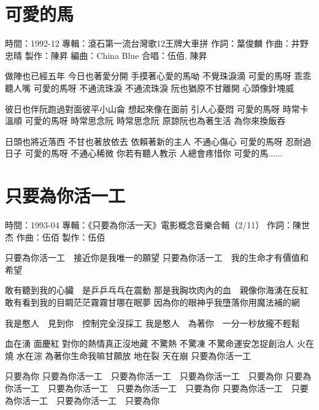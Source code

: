 \documentclass[UTF8,a4paper,oneside,twocolumn,12pt]{ctexbook}
\newcommand{\infopair}[2]{\textbullet #1：#2}
\newcommand{\zc}[1][伍佰]{\infopair{作詞}{#1}}
\newcommand{\zq}[1][伍佰]{\infopair{作曲}{#1}}
\newcommand{\bq}[1][伍佰]{\infopair{編曲}{#1}}
\newcommand{\zj}[1]{\infopair{專輯}{#1}}
\newcommand{\zz}[1]{\infopair{製作}{#1}}
\newcommand{\sj}[1]{\infopair{時間}{#1}}
\newenvironment{info}{\begin{flushleft}\kaishu
	}
	{\end{flushleft}\normalsize\yahei\par}
\newenvironment{lyric}{
	}
{}
\begin{document}
\section{可愛的馬}
\begin{info}
	\sj{1992-12}
	\zj{滾石第一流台灣歌12王牌大車拼}
	\zc[葉俊麟]
	\zq[井野忠晴]
	\zz{陳昇}
	\bq[China Blue]
	\infopair{合唱}{伍佰, 陳昇}
\end{info}
\begin{lyric}
	做陣也已經五年 今日也著愛分開
	手摸著心愛的馬呦 不覺珠淚滴
	可愛的馬呀 乖乖聽人嘴
	可愛的馬呀 不通流珠淚 不通流珠淚
	阮也猶原不甘離開 心頭像針塊威

	彼日也伴阮跑過對面彼平小山侖
	想起來像在面前 引人心憂悶
	可愛的馬呀 時常卡溫順 可愛的馬呀
	時常思念阮 時常思念阮
	原諒阮也為著生活 為你來換飯吞

	日頭也將近落西 不甘也著放依去
	依賴著新的主人 不通心傷心
	可愛的馬呀 忍耐過日子
	可愛的馬呀 不通心稀微
	你若有聽人教示 人總會疼惜你 可愛的馬......
\end{lyric}

\section{只要為你活一工}
\begin{info}
	\sj{1993-04}
	\zj{《只要為你活一天》電影概念音樂合輯（2/11）}
	\zc[陳世杰]
	\zq
	\zz{伍佰}
\end{info}
\begin{lyric}
	只要為你活一工　接近你是我唯一的願望
	只要為你活一工　我的生命才有價值和希望

	敢有聽到我的心臟　是乒乒乓乓在震動
	那是我胸坎肉內的血　親像你海湧在反紅
	敢有看到我的目睭茫茫霧霧甘哪在眠夢
	因為你的眼神乎我墮落你用魔法補的網

	我是憨人　見到你　控制完全沒採工
	我是憨人　為著你　一分一秒放攏不輕鬆

	血在湧 面慶紅 對你的熱情真正沒地藏
	不驚熱 不驚凍 不驚命運安怎捉創治人
	火在燒 水在淙 為著你生命我嘛甘願放
	地在裂 天在崩 只要為你活一工

	只要為你
	只要為你活一工　只要為你活一工　只要為你活一工　只要為你
	只要為你活一工　只要為你活一工　只要為你活一工　只要為你
	只要為你活一工　只要為你活一工　只要為你活一工　只要為你
\end{lyric}
\end{document}
